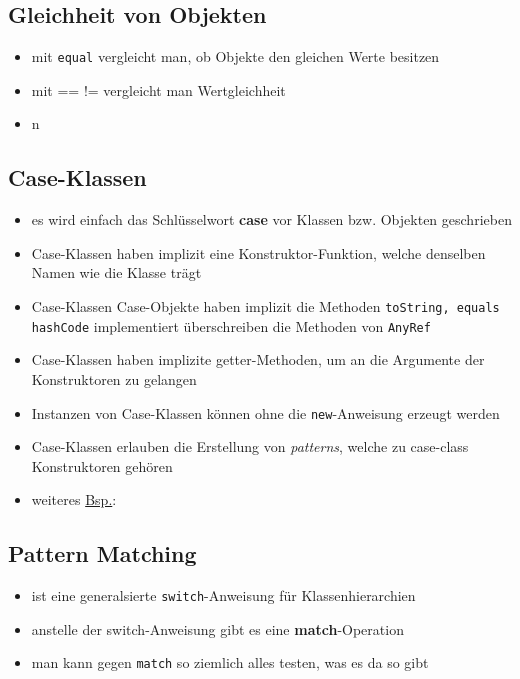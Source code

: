 \subsection{Gleichheit von Objekten}
\begin{itemize}
  \item mit \texttt{equal} vergleicht man, ob Objekte den gleichen
  Werte besitzen
  \item mit == \und != vergleicht man Wertgleichheit
  \item n
\end{itemize}


\subsection{Case-Klassen}
\begin{itemize}
  \item es wird einfach das Schlüsselwort \textbf{case} vor Klassen bzw. 
  Objekten geschrieben
  \item Case-Klassen haben implizit eine Konstruktor-Funktion, welche denselben
  Namen wie die Klasse trägt
  \item Case-Klassen \und Case-Objekte haben implizit die Methoden
  \texttt{toString, equals} \und \texttt{hashCode} implementiert \und 
  überschreiben die Methoden von \texttt{AnyRef}
  \item Case-Klassen haben implizite getter-Methoden, um an die Argumente
  der Konstruktoren zu gelangen
  \item Instanzen von Case-Klassen können ohne die \texttt{new}-Anweisung
  erzeugt werden
  
    
  
  \item Case-Klassen erlauben die Erstellung von \textit{patterns}, welche
  zu case-class Konstruktoren gehören
  \item weiteres \uline{Bsp.}:
  
  
  
\end{itemize}


\subsection{Pattern Matching}
\begin{itemize}
  \item ist eine generalsierte \texttt{switch}-Anweisung für Klassenhierarchien
  \item anstelle der switch-Anweisung gibt es eine \textbf{match}-Operation
  
  

  \item man kann gegen \texttt{match} so ziemlich alles testen, was es da
  so gibt
\end{itemize}
\pagebreak


